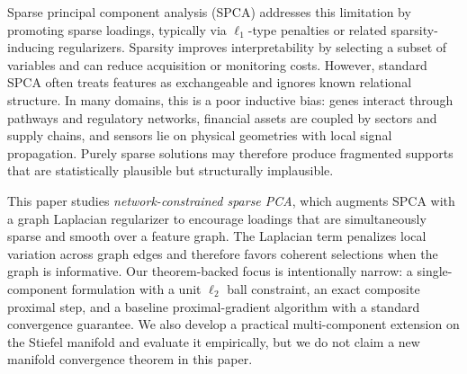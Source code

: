 \documentclass[10pt,twocolumn,letterpaper]{article}
\theoremstyle{definition}
\begin{document}
Sparse principal component analysis (SPCA) addresses this limitation by promoting sparse loadings, typically via $\ell_1$-type penalties or related sparsity-inducing regularizers. Sparsity improves interpretability by selecting a subset of variables and can reduce acquisition or monitoring costs. However, standard SPCA often treats features as exchangeable and ignores known relational structure. In many domains, this is a poor inductive bias: genes interact through pathways and regulatory networks, financial assets are coupled by sectors and supply chains, and sensors lie on physical geometries with local signal propagation. Purely sparse solutions may therefore produce fragmented supports that are statistically plausible but structurally implausible.

This paper studies \emph{network-constrained sparse PCA}, which augments SPCA with a graph Laplacian regularizer to encourage loadings that are simultaneously sparse and smooth over a feature graph. The Laplacian term penalizes local variation across graph edges and therefore favors coherent selections when the graph is informative. Our theorem-backed focus is intentionally narrow: a single-component formulation with a unit $\ell_2$ ball constraint, an exact composite proximal step, and a baseline proximal-gradient algorithm with a standard convergence guarantee. We also develop a practical multi-component extension on the Stiefel manifold and evaluate it empirically, but we do not claim a new manifold convergence theorem in this paper.
\end{document}
